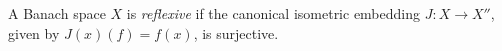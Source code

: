 
A Banach space $X$ is \emph{reflexive} if the canonical isometric embedding $J:X\to X''$, given by $J(x)(f)=f(x)$, is surjective.
